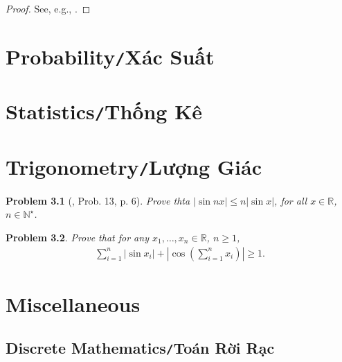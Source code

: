 \documentclass[oneside]{book}
\numberwithin{equation}{section}
\newtheorem{problem}{Problem}[section]
\begin{document}
\begin{proof}[Proof]
	See, e.g., \cite[p. 12]{Gelca_Andreescu2017}.
\end{proof}


\chapter{Probability\texttt{/}Xác Suất}


\chapter{Statistics\texttt{/}Thống Kê}


\chapter{Trigonometry\texttt{/}Lượng Giác}

\begin{problem}[\cite{Gelca_Andreescu2017}, Prob. 13, p. 6]
	Prove thta $|\sin nx|\le n|\sin x|$, for all $x\in\mathbb{R}$, $n\in\mathbb{N}^\star$.
\end{problem}

\begin{problem}
	Prove that for any $x_1,\ldots,x_n\in\mathbb{R}$, $n\ge 1$,
	\begin{align*}
		\sum_{i=1}^n |\sin x_i| + \left|\cos\left(\sum_{i=1}^n x_i\right)\right|\ge 1.
	\end{align*}
\end{problem}


\chapter{Miscellaneous}

\section{Discrete Mathematics\texttt{/}Toán Rời Rạc}
\end{document}
